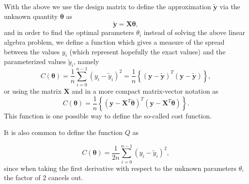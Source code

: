 \documentclass[%
oneside,                 %
final,                   %
10pt]{article}
\newenvironment{block_mdfboxadmon}[1][]{
\begin{block_mdfboxmdframed}[frametitle=#1]
}
{
\end{block_mdfboxmdframed}
}
\begin{document}

\begin{block_mdfboxadmon}[]
With the above we use the design matrix to define the approximation $\bm{\tilde{y}}$ via the unknown quantity $\bm{\theta}$ as
\[
\bm{\tilde{y}}= \bm{X}\bm{\theta},
\]
and in order to find the optimal parameters $\theta_i$ instead of solving the above linear algebra problem, we define a function which gives a measure of the spread between the values $y_i$ (which represent hopefully the exact values) and the parameterized values $\tilde{y}_i$, namely
\[
C(\bm{\theta})=\frac{1}{n}\sum_{i=0}^{n-1}\left(y_i-\tilde{y}_i\right)^2=\frac{1}{n}\left\{\left(\bm{y}-\bm{\tilde{y}}\right)^T\left(\bm{y}-\bm{\tilde{y}}\right)\right\},
\]
or using the matrix $\bm{X}$ and in a more compact matrix-vector notation as
\[
C(\bm{\theta})=\frac{1}{n}\left\{\left(\bm{y}-\bm{X}^T\bm{\theta}\right)^T\left(\bm{y}-\bm{X}^T\bm{\theta}\right)\right\}.
\]
This function is one possible way to define the so-called cost function.



It is also common to define
the function $Q$ as

\[
C(\bm{\theta})=\frac{1}{2n}\sum_{i=0}^{n-1}\left(y_i-\tilde{y}_i\right)^2,
\]
since when taking the first derivative with respect to the unknown parameters $\theta$, the factor of $2$ cancels out.
\end{block_mdfboxadmon} %




\end{document}
